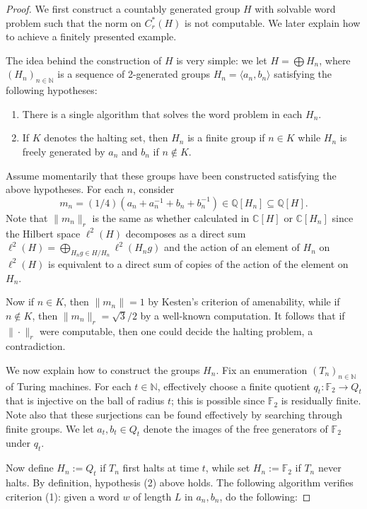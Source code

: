 \documentclass[10pt,a4paper]{amsart}
\newcommand{\N}{\mathbb{N}}
\theoremstyle{plain}
\theoremstyle{definition}
\numberwithin{equation}{section}
\begin{document}
\begin{proof}
We first construct a countably generated group $H$ with solvable word problem such that the norm on $C^*_r(H)$ is not computable.  We later explain how to achieve a finitely presented example.

The idea behind the construction of $H$ is very simple:  we let $H=\bigoplus H_n$, where $(H_n)_{n\in \N}$ is a sequence of 2-generated groups $H_n=\langle a_n,b_n\rangle$ satisfying the following hypotheses:
\begin{enumerate}
    \item There is a single algorithm that solves the word problem in each $H_n$.
    \item If $K$ denotes the halting set, then $H_n$ is a finite group if $n\in K$ while $H_n$ is freely generated by $a_n$ and $b_n$ if $n\notin K$.
\end{enumerate}

Assume momentarily that these groups have been constructed satisfying the above hypotheses.  For each $n$, consider $$m_n = (1/4)(a_n+a_n^{-1}+b_n+b_n^{-1}) \in \mathbb{Q}[H_n]\subseteq \mathbb{Q}[H].$$  Note that $\|m_n\|_r$ is the same as whether calculated in $\mathbb{C}[H]$ or $\mathbb{C}[H_n]$ since the Hilbert space $\ell^2(H)$ decomposes as a direct sum $\ell^2(H)=\bigoplus_{H_ng\in H/H_n} \ell^2(H_ng)$ and the action of an element of $H_n$ on $\ell^2(H)$ is equivalent to a direct sum of copies of the action of the element on $H_n$.

Now if $n\in K$, then $\|m_n\|=1$ by Kesten's criterion of amenability, while if $n\notin K$, then $\|m_n\|_r=\sqrt{3}/2$ by a well-known computation.  It follows that if $\|\cdot\|_r$ were computable, then one could decide the halting problem, a contradiction.

We now explain how to construct the groups $H_n$.  Fix an enumeration $(T_n)_{n\in \N}$ of Turing machines. For each $t\in \N$, effectively choose a finite quotient
$q_t : \mathbb{F}_2 \to Q_t$
that is injective on the ball of radius $t$; this is possible since $\mathbb{F}_2$ is residually finite.  Note also that these surjections can be found effectively by searching through finite groups. We let $a_t,b_t\in Q_t$ denote the images of the free generators of $\mathbb{F}_2$ under $q_t$.

Now define
$H_n:=Q_t$ if $T_n$ first halts at time $t$, while set  $H_n:=\mathbb{F}_2$ if $T_n$ never halts.  By definition, hypothesis (2) above holds.  The following algorithm verifies criterion (1):  given a word $w$ of length $L$ in $a_n,b_n$, do the following:


\end{proof}
\end{document}
